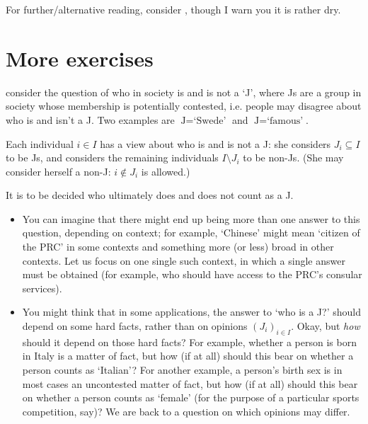 For further/alternative reading, consider \textcite[chapter~2]{Topkis1998}, though I warn you it is rather dry.



\section{More exercises}
\label{tar:exer}

\begin{exercise}
	\label{exercise:J}
	\textcite{KasherRubinstein1997} consider the question of who in society is and is not a `J', where Js are a group in society whose membership is potentially contested, i.e. people may disagree about who is and isn't a J. Two examples are $\text{J}=\text{`Swede'}$ and $\text{J}=\text{`famous'}$.

	Each individual $i \in I$ has a view about who is and is not a J: she considers $J_i \subseteq I$ to be Js, and considers the remaining individuals $I \setminus J_i$ to be non-Js. (She may consider herself a non-J: $i \notin J_i$ is allowed.)

	It is to be decided who ultimately does and does not count as a J. 

	\begin{itemize}

		\item You can imagine that there might end up being more than one answer to this question, depending on context; for example, `Chinese' might mean `citizen of the PRC' in some contexts and something more (or less) broad in other contexts. Let us focus on one single such context, in which a single answer must be obtained (for example, who should have access to the PRC's consular services).

		\item You might think that in some applications, the answer to `who is a J?' should depend on some hard facts, rather than on opinions $(J_i)_{i \in I}$. Okay, but \emph{how} should it depend on those hard facts? For example, whether a person is born in Italy is a matter of fact, but how (if at all) should this bear on whether a person counts as `Italian'? For another example, a person's birth sex is in most cases an uncontested matter of fact, but how (if at all) should this bear on whether a person counts as `female' (for the purpose of a particular sports competition, say)? We are back to a question on which opinions may differ.


\end{itemize}
\end{exercise}
